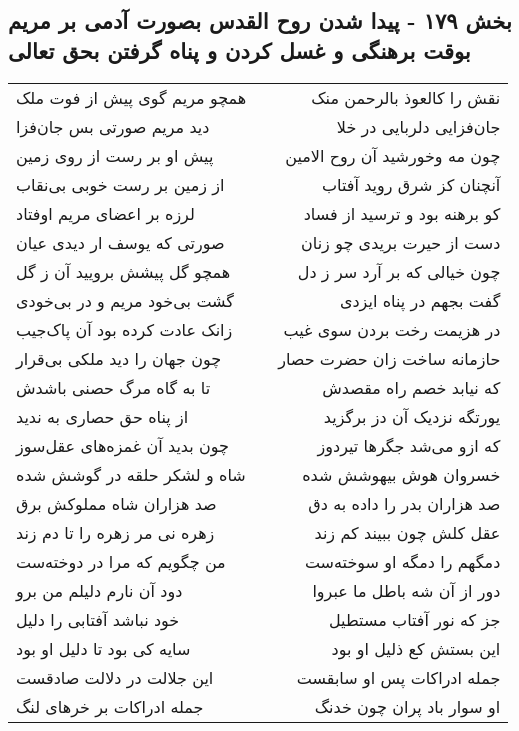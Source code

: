 \begin{center}
\section*{بخش ۱۷۹ - پیدا شدن روح القدس بصورت آدمی بر مریم بوقت برهنگی و غسل کردن و پناه گرفتن بحق تعالی}
\label{sec:sh179}
\begin{longtable}{l p{0.5cm} r}
همچو مریم گوی پیش از فوت ملک
&&
نقش را کالعوذ بالرحمن منک
\\
دید مریم صورتی بس جان‌فزا
&&
جان‌فزایی دلربایی در خلا
\\
پیش او بر رست از روی زمین
&&
چون مه وخورشید آن روح الامین
\\
از زمین بر رست خوبی بی‌نقاب
&&
آنچنان کز شرق روید آفتاب
\\
لرزه بر اعضای مریم اوفتاد
&&
کو برهنه بود و ترسید از فساد
\\
صورتی که یوسف ار دیدی عیان
&&
دست از حیرت بریدی چو زنان
\\
همچو گل پیشش برویید آن ز گل
&&
چون خیالی که بر آرد سر ز دل
\\
گشت بی‌خود مریم و در بی‌خودی
&&
گفت بجهم در پناه ایزدی
\\
زانک عادت کرده بود آن پاک‌جیب
&&
در هزیمت رخت بردن سوی غیب
\\
چون جهان را دید ملکی بی‌قرار
&&
حازمانه ساخت زان حضرت حصار
\\
تا به گاه مرگ حصنی باشدش
&&
که نیابد خصم راه مقصدش
\\
از پناه حق حصاری به ندید
&&
یورتگه نزدیک آن دز برگزید
\\
چون بدید آن غمزه‌های عقل‌سوز
&&
که ازو می‌شد جگرها تیردوز
\\
شاه و لشکر حلقه در گوشش شده
&&
خسروان هوش بیهوشش شده
\\
صد هزاران شاه مملوکش برق
&&
صد هزاران بدر را داده به دق
\\
زهره نی مر زهره را تا دم زند
&&
عقل کلش چون ببیند کم زند
\\
من چگویم که مرا در دوخته‌ست
&&
دمگهم را دمگه او سوخته‌ست
\\
دود آن نارم دلیلم من برو
&&
دور از آن شه باطل ما عبروا
\\
خود نباشد آفتابی را دلیل
&&
جز که نور آفتاب مستطیل
\\
سایه کی بود تا دلیل او بود
&&
این بستش کع ذلیل او بود
\\
این جلالت در دلالت صادقست
&&
جمله ادراکات پس او سابقست
\\
جمله ادراکات بر خرهای لنگ
&&
او سوار باد پران چون خدنگ
\\

\end{longtable}
\end{center}
